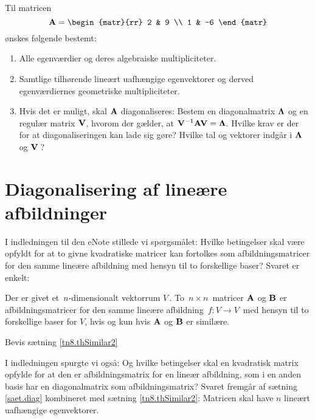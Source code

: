 \begin{exercise}
Til matricen
\begin{equation}
\mA = \begin{matr}{rr} 2 & 9 \\ 1 & -6 \end{matr}
\end{equation}
ønskes følgende bestemt:
\begin{enumerate}
\item Alle egenværdier og deres algebraiske multipliciteter.
\item Samtlige tilhørende lineært uafhængige egenvektorer og derved egenværdiernes geometriske multipliciteter.
\item Hvis det er muligt, skal $ \mathbf{A} $ diagonaliseres: Bestem en diagonalmatrix $ \bm{\Lambda} $ og en regulær matrix $ \mathbf{V} $, hvorom der gælder, at $ \mathbf{V}^{-1}\mathbf{A} \mathbf{V} = \bm{\Lambda} $. Hvilke krav er der for at diagonaliseringen kan lade sig gøre? Hvilke tal og vektorer indgår i $ \bm{\Lambda} $ og $ \mathbf{V}\, $?
\end{enumerate}
\end{exercise}

\section{Diagonalisering af lineære afbildninger}
I indledningen til den eNote stillede vi spørgsmålet: Hvilke betingelser skal være opfyldt for at to givne kvadratiske matricer kan fortolkes som afbildningsmatricer for den samme lineære afbildning med hensyn til to forskellige baser? Svaret er enkelt:

\begin{theorem}\label{tn8.thSimilar2}
Der er givet et $\,n$-dimensionalt vektorrum $V\,$. To $\,n\times n\,$ matricer $\mathbf{A}$ og $\mathbf{B}$ er afbildningsmatricer for den samme lineære afbildning $\,f:V\rightarrow V\,$ med hensyn til to forskellige baser for $V$, hvis og kun hvis  $\mathbf{A}$ og $\mathbf{B}$ er similære.
\end{theorem}

\begin{exercise}
Bevis sætning \ref{tn8.thSimilar2}
\end{exercise}

I indledningen spurgte vi også: Og hvilke betingelser skal en kvadratisk matrix opfylde for at den er afbildningsmatrix for en lineær afbildning, som i en anden basis har en diagonalmatrix som afbildningsmatrix? Svaret fremgår af sætning \ref{saet.diag} kombineret med sætning \ref{tn8.thSimilar2}: Matricen skal have $n$ lineært uafhængige egenvektorer.\bs

